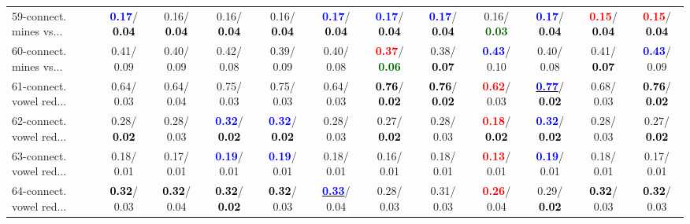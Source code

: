 \begin{table}[h]
\begin{center}
{\begin{tabular}{lc|c|c|c|c|c|c|c|c|c|c}
59-connect. mines vs... & \textcolor{blue}{\textbf{  0.17}}/\textcolor{black}{\textbf{  0.04}} &   0.16/\textcolor{black}{\textbf{  0.04}} &   0.16/\textcolor{black}{\textbf{  0.04}} &   0.16/\textcolor{black}{\textbf{  0.04}} & \textcolor{blue}{\textbf{  0.17}}/\textcolor{black}{\textbf{  0.04}} & \textcolor{blue}{\textbf{  0.17}}/\textcolor{black}{\textbf{  0.04}} & \textcolor{blue}{\textbf{  0.17}}/\textcolor{black}{\textbf{  0.04}} &   0.16/\textcolor{darkgreen}{\textbf{  0.03}} & \textcolor{blue}{\textbf{  0.17}}/\textcolor{black}{\textbf{  0.04}} & \textcolor{red}{\textbf{  0.15}}/\textcolor{black}{\textbf{  0.04}} & \textcolor{red}{\textbf{  0.15}}/\textcolor{black}{\textbf{  0.04}} \\
60-connect. mines vs... &   0.41/  0.09 &   0.40/  0.09 &   0.42/  0.08 &   0.39/  0.09 &   0.40/  0.08 & \textcolor{red}{\textbf{  0.37}}/\textcolor{darkgreen}{\textbf{  0.06}} &   0.38/\textcolor{black}{\textbf{  0.07}} & \textcolor{blue}{\textbf{  0.43}}/  0.10 &   0.40/  0.08 &   0.41/\textcolor{black}{\textbf{  0.07}} & \textcolor{blue}{\textbf{  0.43}}/  0.09 \\ \hline
61-connect. vowel red... &   0.64/  0.03 &   0.64/  0.04 &   0.75/  0.03 &   0.75/  0.03 &   0.64/  0.03 & \textcolor{black}{\textbf{  0.76}}/\textcolor{black}{\textbf{  0.02}} & \textcolor{black}{\textbf{  0.76}}/\textcolor{black}{\textbf{  0.02}} & \textcolor{red}{\textbf{  0.62}}/  0.03 & \underline{\textcolor{blue}{\textbf{  0.77}}}/\textcolor{black}{\textbf{  0.02}} &   0.68/  0.03 & \textcolor{black}{\textbf{  0.76}}/\textcolor{black}{\textbf{  0.02}} \\
62-connect. vowel red... &   0.28/\textcolor{black}{\textbf{  0.02}} &   0.28/  0.03 & \textcolor{blue}{\textbf{  0.32}}/\textcolor{black}{\textbf{  0.02}} & \textcolor{blue}{\textbf{  0.32}}/\textcolor{black}{\textbf{  0.02}} &   0.28/  0.03 &   0.27/\textcolor{black}{\textbf{  0.02}} &   0.28/  0.03 & \textcolor{red}{\textbf{  0.18}}/\textcolor{black}{\textbf{  0.02}} & \textcolor{blue}{\textbf{  0.32}}/\textcolor{black}{\textbf{  0.02}} &   0.28/  0.03 &   0.27/\textcolor{black}{\textbf{  0.02}} \\
63-connect. vowel red... &   0.18/  0.01 &   0.17/  0.01 & \textcolor{blue}{\textbf{  0.19}}/  0.01 & \textcolor{blue}{\textbf{  0.19}}/  0.01 &   0.18/  0.01 &   0.16/  0.01 &   0.18/  0.01 & \textcolor{red}{\textbf{  0.13}}/  0.01 & \textcolor{blue}{\textbf{  0.19}}/  0.01 &   0.18/  0.01 &   0.17/  0.01 \\
64-connect. vowel red... & \textcolor{black}{\textbf{  0.32}}/  0.03 & \textcolor{black}{\textbf{  0.32}}/  0.04 & \textcolor{black}{\textbf{  0.32}}/\textcolor{black}{\textbf{  0.02}} & \textcolor{black}{\textbf{  0.32}}/  0.03 & \underline{\textcolor{blue}{\textbf{  0.33}}}/  0.04 &   0.28/  0.03 &   0.31/  0.03 & \textcolor{red}{\textbf{  0.26}}/  0.04 &   0.29/\textcolor{black}{\textbf{  0.02}} & \textcolor{black}{\textbf{  0.32}}/  0.03 & \textcolor{black}{\textbf{  0.32}}/  0.03 \\\end{tabular}}\label{stratsALCKappa1Allalla}

\end{center}
\end{table}
